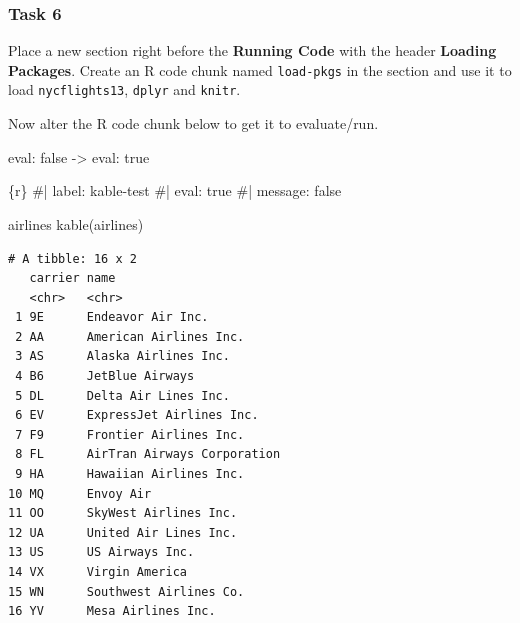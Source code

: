 \documentclass[
  letterpaper,
  DIV=11,
  numbers=noendperiod]{scrreprt}
\newenvironment{Shaded}{\begin{snugshade}}{\end{snugshade}}
\newcommand{\CommentTok}[1]{\textcolor[rgb]{0.37,0.37,0.37}{#1}}
\newcommand{\FunctionTok}[1]{\textcolor[rgb]{0.28,0.35,0.67}{#1}}
\newcommand{\InformationTok}[1]{\textcolor[rgb]{0.37,0.37,0.37}{#1}}
\newcommand{\NormalTok}[1]{\textcolor[rgb]{0.00,0.23,0.31}{#1}}
\begin{document}
\hypertarget{task-6}{%
\subsubsection*{Task 6}\label{task-6}}

Place a new section right before the \textbf{Running Code} with the
header \textbf{Loading Packages}. Create an R code chunk named
\texttt{load-pkgs} in the section and use it to load
\texttt{nycflights13}, \texttt{dplyr} and \texttt{knitr}.

Now alter the R code chunk below to get it to evaluate/run.

\begin{tcolorbox}[enhanced jigsaw, colframe=quarto-callout-important-color-frame, breakable, colback=white, toprule=.15mm, leftrule=.75mm, left=2mm, opacityback=0, rightrule=.15mm, arc=.35mm, bottomrule=.15mm]
eval: false -\textgreater{} eval: true
\end{tcolorbox}

\begin{Shaded}
\begin{Highlighting}[]
\InformationTok{\textasciigrave{}\textasciigrave{}\textasciigrave{}\{r\}}
\CommentTok{\#| label: kable{-}test}
\CommentTok{\#| eval: true}
\CommentTok{\#| message: false}

\NormalTok{airlines}
\FunctionTok{kable}\NormalTok{(airlines)}
\InformationTok{\textasciigrave{}\textasciigrave{}\textasciigrave{}}
\end{Highlighting}
\end{Shaded}

\begin{verbatim}
# A tibble: 16 x 2
   carrier name                       
   <chr>   <chr>                      
 1 9E      Endeavor Air Inc.          
 2 AA      American Airlines Inc.     
 3 AS      Alaska Airlines Inc.       
 4 B6      JetBlue Airways            
 5 DL      Delta Air Lines Inc.       
 6 EV      ExpressJet Airlines Inc.   
 7 F9      Frontier Airlines Inc.     
 8 FL      AirTran Airways Corporation
 9 HA      Hawaiian Airlines Inc.     
10 MQ      Envoy Air                  
11 OO      SkyWest Airlines Inc.      
12 UA      United Air Lines Inc.      
13 US      US Airways Inc.            
14 VX      Virgin America             
15 WN      Southwest Airlines Co.     
16 YV      Mesa Airlines Inc.         
\end{verbatim}
\end{document}
